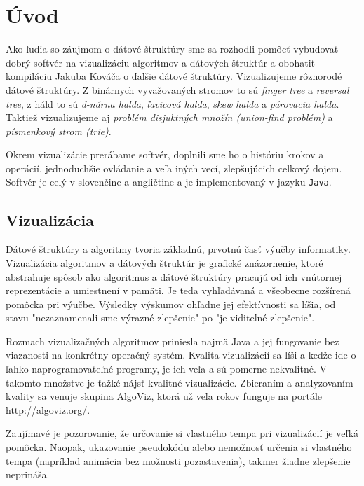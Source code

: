 \section{Úvod}
Ako ľudia so záujmom o dátové štruktúry sme sa rozhodli pomôcť vybudovať 
dobrý softvér na vizualizáciu algoritmov a dátových štruktúr a obohatiť 
kompiláciu Jakuba Kováča \citep{kuko} o ďalšie dátové štruktúry. 
Vizualizujeme rôznorodé dátové štruktúry. Z binárnych vyvažovaných stromov 
to sú \emph{finger tree} a \emph{reversal tree}, z háld to sú \emph{d-nárna 
halda}, \emph{ľavicová halda}, \emph{skew halda} a \emph{párovacia halda}. 
Taktiež vizualizujeme aj \emph{problém disjuktných množín (union-find 
problém)} a \emph{písmenkový strom (trie)}. 

Okrem vizualizácie prerábame softvér, doplnili sme ho o históriu krokov 
a operácií, jednoduchšie ovládanie a veľa iných vecí, zlepšujúcich 
celkový dojem. Softvér je celý v slovenčine a angličtine a je 
implementovaný v jazyku \texttt{Java}.

\subsection{Vizualizácia}
Dátové štruktúry a algoritmy tvoria základnú, prvotnú časť výučby 
informatiky. Vizualizácia algoritmov a dátových štruktúr je grafické 
znázornenie, ktoré abstrahuje spôsob ako algoritmus a dátové štruktúry 
pracujú od ich vnútornej reprezentácie a umiestnení v pamäti. Je teda 
vyhľadávaná a všeobecne rozšírená pomôcka pri výučbe. Výsledky výskumov 
ohľadne jej efektívnosti sa líšia, od stavu "nezaznamenali sme výrazné 
zlepšenie" po "je viditeľné zlepšenie". \citep{shaffer}

Rozmach vizualizačných algoritmov priniesla najmä Java a jej fungovanie 
bez viazanosti na konkrétny operačný systém. Kvalita vizualizácií sa líši 
a keďže ide o ľahko naprogramovateľné programy, je ich veľa a sú pomerne 
nekvalitné. V takomto množstve je ťažké nájsť kvalitné vizualizácie. 
Zbieraním a analyzovaním kvality sa venuje skupina AlgoViz, ktorá už 
veľa rokov funguje na portále \url{http://algoviz.org/}.

Zaujímavé je pozorovanie, že určovanie si vlastného tempa pri vizualizácií 
je veľká pomôcka. Naopak, ukazovanie pseudokódu alebo nemožnosť určenia si
vlastného tempa (napríklad animácia bez možnosti pozastavenia), takmer 
žiadne zlepšenie neprináša. \citep{shaffer,saraiya}

